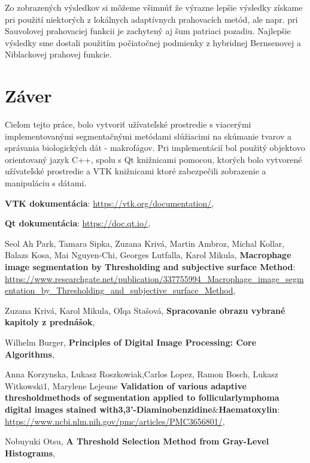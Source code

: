\documentclass[a4paper,11pt,oneside]{article}%
\begin{document}

Zo zobrazených výsledkov si môžeme všimnúť že výrazne lepšie výsledky získame pri použití niektorých z lokálnych adaptívnych prahovacích metód, ale napr. pri Sauvolovej prahovaciej funkcii je zachytený aj šum patriaci pozadiu. Najlepšie výsledky sme dostali použitím počiatočnej podmienky z hybridnej Bernsenovej a Niblackovej prahovej funkcie. 

\newpage
\section{Záver}

Cieľom tejto práce, bolo vytvoriť užívateľské prostredie s viacerými implementovanými segmentačnými metódami slúžiacimi na skúmanie tvarov a správania biologických dát - makrofágov. Pri implementácií bol použitý objektovo orientovaný jazyk C++, spolu s Qt knižnicami pomocou, ktorých bolo vytvorené užívateľské prostredie a VTK knižnicami ktoré zabezpečili zobrazenie a manipuláciu s dátami.



\newpage
\begin{thebibliography}{50}

\textbf{VTK dokumentácia}:
\url{https://vtk.org/documentation/},

\textbf{Qt dokumentácia}:
\url{https://doc.qt.io/},

Seol Ah Park, Tamara Sipka, Zuzana Krivá, Martin Ambroz, Michal Kollar, Balazs Kosa, Mai Nguyen-Chi, Georges Lutfalla, Karol Mikula, \textbf{Macrophage image segmentation by Thresholding and subjective surface Method}: \\ 
\url{https://www.researchgate.net/publication/337755994_Macrophage_image_segmentation_by_Thresholding_and_subjective_surface_Method},

Zuzana Krivá, Karol Mikula, Oľqa Stašová, \textbf{Spracovanie obrazu vybrané kapitoly z prednášok}, 

Wilhelm Burger, \textbf{Principles of Digital Image Processing: Core Algorithms},

Anna Korzynska, Lukasz Roszkowiak,Carlos Lopez, Ramon Bosch, Lukasz Witkowski1,  Marylene Lejeune \textbf{Validation of various adaptive thresholdmethods of segmentation applied to follicularlymphoma digital images stained with3,3’-Diaminobenzidine$\&$Haematoxylin}: 
\url{https://www.ncbi.nlm.nih.gov/pmc/articles/PMC3656801/},

Nobuyuki Otsu, \textbf{A Threshold Selection Method from Gray-Level Histograms}, 

\end{thebibliography}
\end{document}
